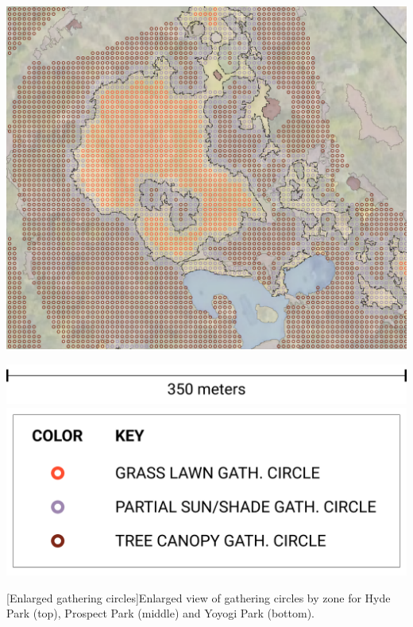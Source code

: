 \begin{multicols}{2}
\begin{minipage}{0.45\textwidth}
    \includegraphics[width=\linewidth]{images/gatherings/yoyogi_circles_1000}\par\hspace{3pt}
    \includegraphics[width=\linewidth]{images/gatherings/scale_legend_4.png}
    \includegraphics[width=\linewidth]{images/gatherings/gatherings_legend_3.png}
    \par{}[Enlarged gathering circles]{Enlarged view of gathering circles by zone for Hyde Park (top), Prospect Park (middle) and Yoyogi Park (bottom).}
    \label{fig:circles_1000}
\end{minipage}

\end{multicols}


